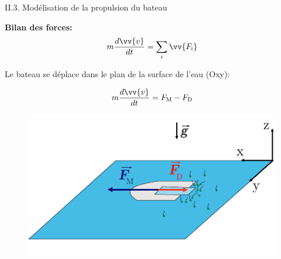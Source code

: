 \documentclass[aspectratio=169,10pt]{beamer}
\begin{document}
\begin{frame}{II.3. Modélisation de la propulsion du bateau}
    \begin{minipage}{6cm}
        \textbf{Bilan des forces:}\bigskip
        \begin{equation}
            m\frac{d\vv{v}}{dt} = \sum_i \vv{F_{\rm i}}\nonumber
        \end{equation}

        Le bateau se déplace dans le plan de la surface de l'eau (Oxy): 

        \begin{equation}
            m\frac{d\vv{v}}{dt} = F_{\rm M} - F_{\rm D}
        \end{equation}

    \end{minipage}
    \begin{minipage}{7cm}  
        \begin{figure}
            \centering
            \includegraphics[scale=1]{./figures/SchemaModeleBateau.pdf}
        \end{figure}
    \end{minipage}
\end{frame}
\end{document}
